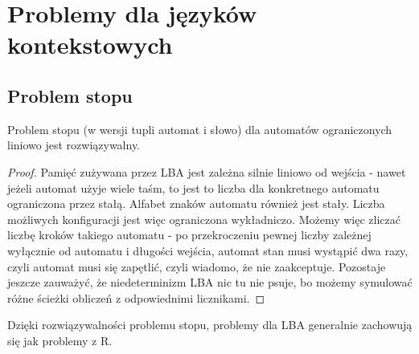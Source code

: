 \section{Problemy dla języków kontekstowych}

\subsection{Problem stopu}

\begin{lemma}
	Problem stopu (w wersji tupli automat i słowo) dla automatów ograniczonych liniowo jest rozwiązywalny.
\end{lemma}

\begin{proof}
	Pamięć zużywana przez LBA jest zależna silnie liniowo od wejścia - nawet jeżeli automat użyje wiele taśm, to jest to liczba dla konkretnego automatu ograniczona przez stałą.
	Alfabet znaków automatu również jest stały. Liczba możliwych konfiguracji jest więc ograniczona wykładniczo. Możemy więc zliczać liczbę kroków takiego automatu - po
	przekroczeniu pewnej liczby zależnej wyłącznie od automatu i długości wejścia, automat stan musi wystąpić dwa razy, czyli automat musi się zapętlić, czyli wiadomo, że nie zaakceptuje.
	Pozostaje jeszcze zauważyć, że niedeterminizm LBA nic tu nie psuje, bo możemy symulować różne ścieżki obliczeń z odpowiednimi licznikami.
\end{proof}

Dzięki rozwiązywalności problemu stopu, problemy dla LBA generalnie zachowują się jak problemy z R.